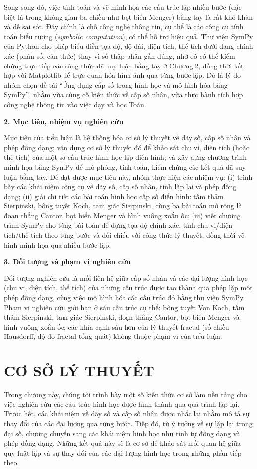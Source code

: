 \documentclass[12pt,a4paper,oneside]{book}
\theoremstyle{theorem}
\theoremstyle{definition}
\begin{document}
Song song đó, việc tính toán và vẽ minh họa các cấu trúc lặp nhiều bước (đặc biệt là trong không gian ba chiều như bọt biển Menger) bằng tay là rất khó khăn và dễ sai sót. Đây chính là chỗ công nghệ thông tin, cụ thể là các công cụ tính toán biểu tượng (\textit{symbolic computation}), có thể hỗ trợ hiệu quả. Thư viện SymPy của Python cho phép biểu diễn tọa độ, độ dài, diện tích, thể tích dưới dạng chính xác (phân số, căn thức) thay vì số thập phân gần đúng, nhờ đó có thể kiểm chứng trực tiếp các công thức đã suy luận bằng tay ở Chương 2, đồng thời kết hợp với Matplotlib để trực quan hóa hình ảnh qua từng bước lặp. Đó là lý do nhóm chọn đề tài ``Ứng dụng cấp số trong hình học và mô hình hóa bằng SymPy'', nhằm vừa củng cố kiến thức về cấp số nhân, vừa thực hành tích hợp công nghệ thông tin vào việc dạy và học Toán.

\noindent\textbf{2. Mục tiêu, nhiệm vụ nghiên cứu}

Mục tiêu của tiểu luận là hệ thống hóa cơ sở lý thuyết về dãy số, cấp số nhân và phép đồng dạng; vận dụng cơ sở lý thuyết đó để khảo sát chu vi, diện tích (hoặc thể tích) của một số cấu trúc hình học lặp điển hình; và xây dựng chương trình minh họa bằng SymPy để mô phỏng, tính toán, kiểm chứng các kết quả đã suy luận bằng tay. Để đạt được mục tiêu này, nhóm thực hiện các nhiệm vụ: (i) trình bày các khái niệm công cụ về dãy số, cấp số nhân, tính lặp lại và phép đồng dạng; (ii) giải chi tiết các bài toán hình học cấp số điển hình: tấm thảm Sierpinski, bông tuyết Koch, tam giác Sierpinski, cùng ba bài toán mở rộng là đoạn thẳng Cantor, bọt biển Menger và hình vuông xoắn ốc; (iii) viết chương trình SymPy cho từng bài toán để dựng tọa độ chính xác, tính chu vi/diện tích/thể tích theo từng bước và đối chiếu với công thức lý thuyết, đồng thời vẽ hình minh họa qua nhiều bước lặp.

\noindent\textbf{3. Đối tượng và phạm vi nghiên cứu}

Đối tượng nghiên cứu là mối liên hệ giữa cấp số nhân và các đại lượng hình học (chu vi, diện tích, thể tích) của những cấu trúc được tạo thành qua phép lặp một phép đồng dạng, cùng việc mô hình hóa các cấu trúc đó bằng thư viện SymPy. Phạm vi nghiên cứu giới hạn ở sáu cấu trúc cụ thể: bông tuyết Von Koch, tấm thảm Sierpinski, tam giác Sierpinski, đoạn thẳng Cantor, bọt biển Menger và hình vuông xoắn ốc; các khía cạnh sâu hơn của lý thuyết fractal (số chiều Hausdorff, độ đo fractal tổng quát) không thuộc phạm vi của tiểu luận.

\chapter{CƠ SỞ LÝ THUYẾT}
\noindent Trong chương này, chúng tôi trình bày một số kiến thức cơ sở làm nền tảng cho việc nghiên cứu các cấu trúc hình học được hình thành qua quá trình lặp lại. Trước hết, các khái niệm về dãy số và cấp số nhân được nhắc lại nhằm mô tả sự thay đổi của các đại lượng qua từng bước. Tiếp đó, từ ý tưởng về sự lặp lại trong đại số, chương chuyển sang các khái niệm hình học như tính tự đồng dạng và phép đồng dạng. Những kết quả này sẽ là cơ sở để khảo sát mối quan hệ giữa quy luật lặp và sự thay đổi của các đại lượng hình học trong những phần tiếp theo.
\end{document}
